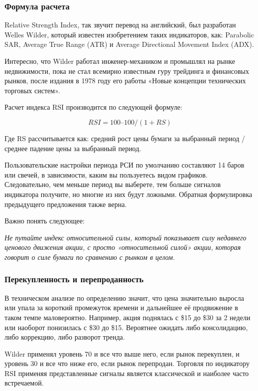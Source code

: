 \documentclass[a5paper]{article}
\begin{document}
\subsubsection{Формула расчета}

Relative Strength Index, так звучит перевод на английский, был разработан Welles Wilder, который известен изобретением таких индикаторов, как: Parabolic SAR, Average True Range (ATR) и Average Directional Movement Index (ADX).

Интересно, что Wilder работал инженер-механиком и промышлял на рынке недвижимости, пока не стал всемирно известным гуру трейдинга и финансовых рынков, после издания в 1978 году его работы «Новые концепции технических торговых систем».

Расчет индекса RSI производится по следующей формуле:

    $$RSI = 100 – 100 / (1 + RS)$$

Где RS рассчитывается как: средний рост цены бумаги за выбранный период / среднее падение цены за выбранный период.

Пользовательские настройки периода РСИ по умолчанию составляют 14 баров или свечей, в зависимости, каким вы пользуетесь видом графиков. Следовательно, чем меньше период вы выберете, тем больше сигналов индикатора получите, но многие из них будут ложными. Обратная формулировка предыдущего предложения также верна.

Важно понять следующее:

    \emph{Не путайте индекс относительной силы, который показывает силу недавнего ценового движения акции, с просто «относительной силой» акции, которая говорит о силе бумаги по сравнению с рынком в целом.}

\subsubsection{Перекупленность и перепроданность}

В техническом анализе по определению значит, что цена значительно выросла или упала за короткий промежуток времени и дальнейшее её продвижение в таком темпе маловероятно. Например, акция поднялась с \$15 до \$30 за 2 недели или наоборот понизилась с \$30 до \$15. Вероятнее ожидать либо консолидацию, либо коррекцию, либо разворот тренда.

Wilder применял уровень 70 и все что выше него, если рынок перекуплен, и уровень 30 и все что ниже его, если рынок перепродан. Торговля по индикатору RSI применяя представленные сигналы является классической и наиболее часто встречаемой.
\end{document}
